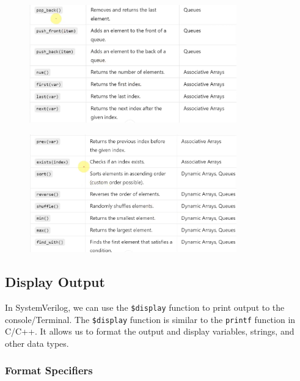 \documentclass[12pt, a4paper]{article}
\begin{document}
\vspace{-2em}
\begin{figure}[H]
    \centering
    \includegraphics[width=0.8\textwidth]{DataTypes_sum3.png}
\end{figure}
\vspace{-2em}
\begin{figure}[H]
    \centering
    \includegraphics[width=0.8\textwidth]{DataTypes_sum4.png}
\end{figure}

\subsection{Display Output}

In SystemVerilog, we can use the \texttt{\$display} function to print output to the console/Terminal. The \texttt{\$display} function is similar to the \texttt{printf} function in C/C++. It allows us to format the output and display variables, strings, and other data types.

\subsubsection{Format Specifiers}
\end{document}
